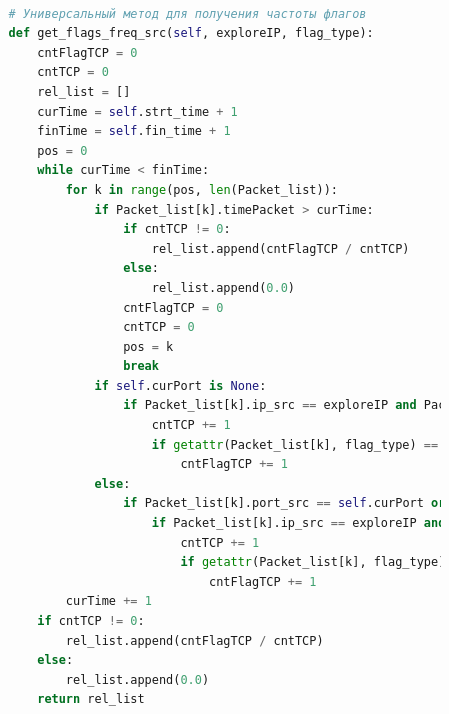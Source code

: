 \documentclass[bachelor, och, coursework]{SCWorks}
\begin{document}
\begin{lstlisting}[language=Python]
      
          # Универсальный метод для получения частоты флагов
          def get_flags_freq_src(self, exploreIP, flag_type):
              cntFlagTCP = 0
              cntTCP = 0
              rel_list = []
              curTime = self.strt_time + 1
              finTime = self.fin_time + 1
              pos = 0
              while curTime < finTime:
                  for k in range(pos, len(Packet_list)):
                      if Packet_list[k].timePacket > curTime:
                          if cntTCP != 0:
                              rel_list.append(cntFlagTCP / cntTCP)
                          else:
                              rel_list.append(0.0)
                          cntFlagTCP = 0
                          cntTCP = 0
                          pos = k
                          break
                      if self.curPort is None:
                          if Packet_list[k].ip_src == exploreIP and Packet_list[k].protoType == 'TCP':
                              cntTCP += 1
                              if getattr(Packet_list[k], flag_type) == '1':
                                  cntFlagTCP += 1
                      else:
                          if Packet_list[k].port_src == self.curPort or Packet_list[k].port_dest == self.curPort:
                              if Packet_list[k].ip_src == exploreIP and Packet_list[k].protoType == 'TCP':
                                  cntTCP += 1
                                  if getattr(Packet_list[k], flag_type) == '1':
                                      cntFlagTCP += 1
                  curTime += 1
              if cntTCP != 0:
                  rel_list.append(cntFlagTCP / cntTCP)
              else:
                  rel_list.append(0.0)
              return rel_list
      

\end{lstlisting}
\end{document}
